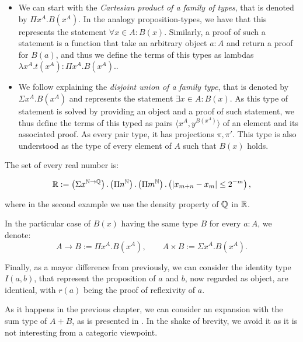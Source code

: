 \begin{itemize}
  \item We can start with the \emph{Cartesian product of a family of types}, that is denoted by $\Pi x^A. B(x^A)$. In the analogy proposition-types, we have that this represents the statement $\forall x \in A : B(x)$. Similarly, a proof of such a statement is a function that take an arbitrary object $a:A$ and return a proof for $B(a)$, and thus we define the terms of this types as lambdas $\lambda x^A.t(x^A) : \Pi x^A. B(x^A).$.\\


\item We follow explaining the \emph{disjoint union of a family type}, that is denoted by $\Sigma x^A. B(x^A)$ and represents the statement $\exists x \in A : B(x)$. As this type of statement is solved by providing an object and a proof of such statement, we thus define the terms of this typed as pairs $\langle x^A, y^{B(x^A)}\rangle$ of an element and its associated proof. As every pair type, it has projections $\pi,\pi'$. This type is also understood as the type of every element of $A$ such that $B(x)$ holds.
\end{itemize}
\begin{example}
 The set of every real number is:

    $$\mathbb{R} := \left(\Sigma x^{\mathbb{N}\to\mathbb{Q}}\right).\left(\Pi n^{\mathbb{N}}\right).\left(\Pi m^{\mathbb{N}}\right).\left(|x_{m+n} - x_m| \le 2^{-m}\right),$$
    
  where in the second example we use the density property of $\mathbb{Q}$ in $\mathbb{R}$.\\
\end{example}

In the particular case of $B(x)$ having the same type $B$ for every $a:A$, we denote:
$$A\to B:= \Pi x^A. B(x^A),\qquad A\times B := \Sigma x^A. B(x^A).$$

Finally, as a mayor difference from previously, we can consider the identity type $I(a,b)$, that represent the proposition of $a$ and $b$, now regarded as object, are identical, with $r(a)$ being the proof of reflexivity of $a$. 


\begin{remark}
  As it happens in the previous chapter, we can consider an expansion with the sum type of $A+B$, as is presented in \cite[Section 1.6]{martinlof1973intuitionistic}. In the shake of brevity, we avoid it as it is not interesting from a categoric viewpoint.
\end{remark}

